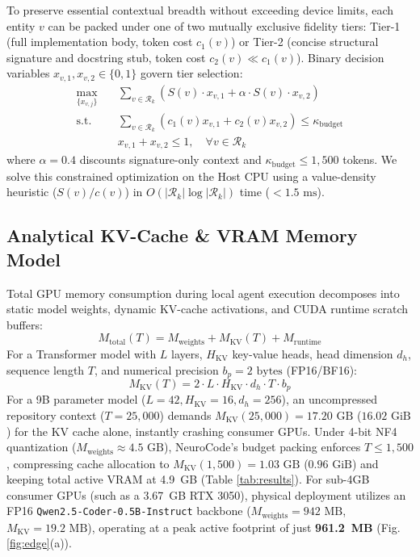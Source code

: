 \documentclass[conference]{IEEEtran}
\begin{document}
To preserve essential contextual breadth without exceeding device limits, each entity $v$ can be packed under one of two mutually exclusive fidelity tiers: Tier-1 (full implementation body, token cost $c_1(v)$) or Tier-2 (concise structural signature and docstring stub, token cost $c_2(v) \ll c_1(v)$). Binary decision variables $x_{v,1}, x_{v,2} \in \{0, 1\}$ govern tier selection:
\begin{equation}
\begin{aligned}
\max_{\{x_{v,j}\}} \quad &\sum_{v \in \mathcal{R}_k} \left( S(v) \cdot x_{v,1} + \alpha \cdot S(v) \cdot x_{v,2} \right) \\
\text{s.t.} \quad &\sum_{v \in \mathcal{R}_k} \left( c_1(v) x_{v,1} + c_2(v) x_{v,2} \right) \le \kappa_{\text{budget}} \\
&x_{v,1} + x_{v,2} \le 1, \quad \forall v \in \mathcal{R}_k
\end{aligned}
\end{equation}
where $\alpha = 0.4$ discounts signature-only context and $\kappa_{\text{budget}} \le 1,500$ tokens. We solve this constrained optimization on the Host CPU using a value-density heuristic ($S(v)/c(v)$) in $O(|\mathcal{R}_k| \log |\mathcal{R}_k|)$ time ($<1.5\text{ ms}$).

\subsection{Analytical KV-Cache \& VRAM Memory Model}
Total GPU memory consumption during local agent execution decomposes into static model weights, dynamic KV-cache activations, and CUDA runtime scratch buffers:
\begin{equation}
M_{\text{total}}(T) = M_{\text{weights}} + M_{\text{KV}}(T) + M_{\text{runtime}}
\end{equation}
For a Transformer model with $L$ layers, $H_{\text{KV}}$ key-value heads, head dimension $d_h$, sequence length $T$, and numerical precision $b_p = 2\text{ bytes}$ (FP16/BF16):
\begin{equation}
M_{\text{KV}}(T) = 2 \cdot L \cdot H_{\text{KV}} \cdot d_h \cdot T \cdot b_p
\end{equation}
For a 9B parameter model ($L=42, H_{\text{KV}}=16, d_h=256$), an uncompressed repository context ($T=25,000$) demands $M_{\text{KV}}(25{,}000) = 17.20\text{ GB}$ ($16.02\text{ GiB}$) for the KV cache alone, instantly crashing consumer GPUs. Under 4-bit NF4 quantization ($M_{\text{weights}} \approx 4.5\text{ GB}$), NeuroCode's budget packing enforces $T \le 1,500$, compressing cache allocation to $M_{\text{KV}}(1{,}500) = 1.03\text{ GB}$ ($0.96\text{ GiB}$) and keeping total active VRAM at 4.9~GB (Table \ref{tab:results}). For sub-4GB consumer GPUs (such as a 3.67~GB RTX 3050), physical deployment utilizes an FP16 \texttt{Qwen2.5-Coder-0.5B-Instruct} backbone ($M_{\text{weights}} = 942\text{ MB}$, $M_{\text{KV}} = 19.2\text{ MB}$), operating at a peak active footprint of just \textbf{961.2~MB} (Fig. \ref{fig:edge}(a)).
\end{document}
